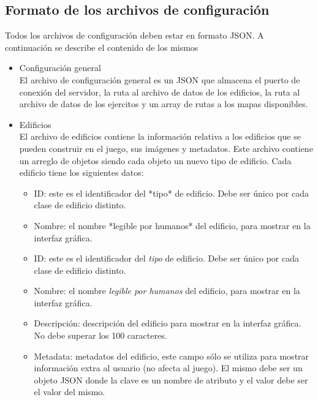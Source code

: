 \documentclass[titlepage,a4paper,12pt]{article}
\begin{document}
\subsection{Formato de los archivos de configuración}

Todos los archivos de configuración deben estar en formato JSON. A continuación se describe el contenido de los mismos

\begin{itemize}

\item Configuración general\\

El archivo de configuración general es un JSON que almacena el puerto de conexión del servidor, la ruta al archivo de datos de los edificios, la ruta al archivo de datos de los ejercitos y un array de rutas a los mapas disponibles.

\item Edificios\\

El archivo de edificios contiene la información relativa a los edificios que se pueden construir en el juego, sus imágenes y metadatos. Este archivo contiene un arreglo de objetos siendo cada objeto un nuevo tipo de edificio. Cada edificio tiene los siguientes datos: 

\begin{itemize}

\item ID:  este es el identificador del *tipo* de edificio. Debe ser único por cada clase de edificio distinto.

\item Nombre: el nombre *legible por humanos* del edificio, para mostrar en la interfaz gráfica.

\item ID:  este es el identificador del \textit{tipo} de edificio. Debe ser único por cada clase de edificio distinto.

\item Nombre: el nombre \textit{legible por humanos} del edificio, para mostrar en la interfaz gráfica.

\item Descripción: descripción del edificio para mostrar en la interfaz gráfica. No debe superar los 100 caracteres.

\item Metadata: metadatos del edificio, este campo sólo se utiliza para mostrar información extra al usuario (no afecta al juego). El mismo debe ser un objeto JSON donde la clave es un nombre de atributo y el valor debe ser el valor del mismo.


\end{itemize}
\end{itemize}
\end{document}
